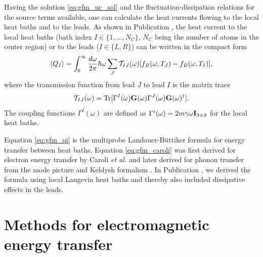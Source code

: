 Having the solution \eqref{eq:gfm_uc_sol} and the fluctuation-dissipation relations for the source terms available, one can calculate the heat currents flowing to the local heat baths and to the leads. As shown in Publication , the heat current to the local heat baths (bath index $I\in \{1,\dots,N_C\}$, $N_C$ being the number of atoms in the center region) or to the leads ($I \in \{L,R\}$) can be written in the compact form
\begin{equation}
 \langle Q_I \rangle =  \int_0^{\infty} \frac{d\omega}{2\pi} \hbar \omega \sum_{J} \mathcal{T}_{IJ}(\omega)[f_B(\omega,T_J)-f_B(\omega,T_I)], \label{eq:gfm_qi}
\end{equation}
where the transmission function from lead $J$ to lead $I$ is the matrix trace 
\begin{equation}
 \mathcal{T}_{IJ}(\omega) = \textrm{Tr}[\Gamma^I(\omega) \mathbf{G}(\omega) \Gamma^J(\omega) \mathbf{G}(\omega)^{\dagger}]. \label{eq:gfm_caroli}
\end{equation}
The coupling functions $\Gamma^I(\omega)$ are defined as $\Gamma^i(\omega)=2m\gamma\omega \mathbf{I}_{3\times3}$ for the local heat baths.

Equation \eqref{eq:gfm_qi} is the multiprobe Landauer-B\"uttiker formula \cite{buttiker92} for energy transfer between heat baths. Equation \eqref{eq:gfm_caroli} was first derived for electron energy transfer by Caroli \textit{et al.} \cite{caroli71} and later derived for phonon transfer from the mode picture \cite{mingo06} and Keldysh formalism \cite{yamamoto06}. In Publication , we derived the formula using local Langevin heat baths and thereby also included dissipative effects in the leads.

\section{Methods for electromagnetic energy transfer}



